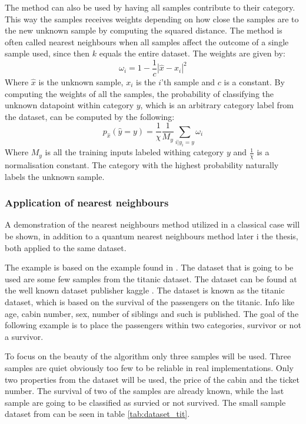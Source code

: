 \documentclass[../main.tex]{subfiles}
\begin{document}
The method can also be used by having all samples contribute to their category. This way the samples receives weights depending on how close the samples are to the new unknown sample by computing the squared distance. The method is often called nearest neighbours when all samples affect the outcome of a single sample used, since then $k$ equals the entire dataset. The weights are given by:
\begin{equation}
    \omega_i=1-\frac{1}{c}|\hat{x}-x_i|^2
\label{eq:knnweight}
\end{equation}
Where \ensuremath{\hat{x}} is the unknown sample, \ensuremath{x_i} is the $i$'th sample and $c$ is a constant. By computing the weights of all the samples, the probability of classifying the unknown datapoint within category \ensuremath{y}, which is an arbitrary category label from the dataset, can be computed by the following:
\begin{equation}
    p_{\hat{x}}(\hat{y}=y)=\frac{1}{\chi}\frac{1}{M_y}\sum_{i|y_i=y}\omega_i
    \label{eq:knnprob}
\end{equation}
Where \ensuremath{M_y} is all the training inputs labeled withing category \ensuremath{y} and \ensuremath{\frac{1}{\chi}} is a normalisation constant. The category with the highest probability naturally labels the unknown sample.

\subsubsection{Application of nearest neighbours}
\label{KNNimp}
A demonstration of the nearest neighbours method utilized in a classical case will be shown, in addition to a quantum nearest neighbours method later i the thesis, both applied to the same dataset.

The example is based on the example found in \cite[ch.~1]{10.5555/3309066}. The dataset that is going to be used are some few samples from the titanic dataset. The dataset can be found at the well known dataset publisher kaggle \cite{cite:kaggletitanic}. The dataset is known as the titanic dataset, which is based on the survival of the passengers on the titanic. Info like age, cabin number, sex, number of siblings and such is published. The goal of the following example is to place the passengers within two categories, survivor or not a survivor.

To focus on the beauty of the algorithm only three samples will be used. Three samples are quiet obviously too few to be reliable in real implementations. Only two properties from the dataset will be used, the price of the cabin and the ticket number. The survival of two of the samples are already known, while the last sample are going to be classified as survied or not survived. The small sample dataset from \cite[ch.~1]{10.5555/3309066} can be seen in table \ref{tab:dataset_tit}.
\end{document}
